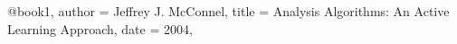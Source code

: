 @book{1,
	author = {Jeffrey J. McConnel},
	title = {Analysis Algorithms: An Active Learning Approach},
	date = {2004},
}
